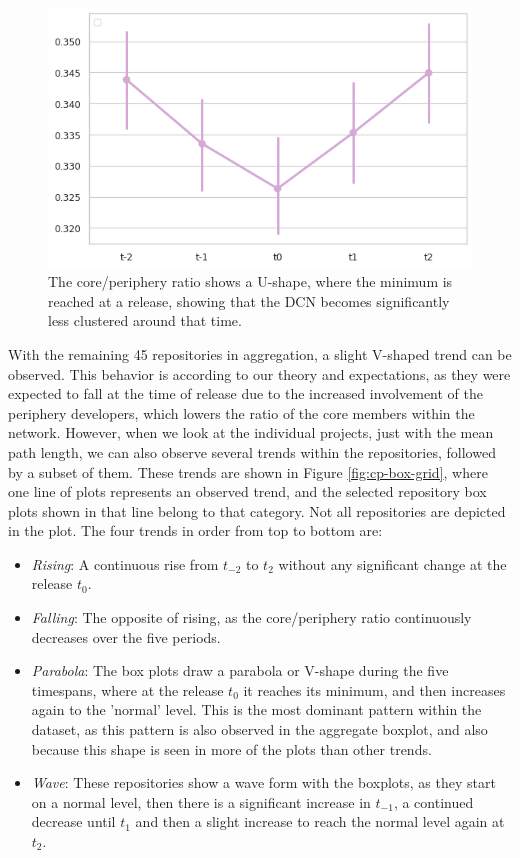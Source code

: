 \begin{figure}[!htbp]
    \centering
    \includegraphics[width=\textwidth]{figures/quantitative/pointplots/cp_ratio.png}
    \caption{The core/periphery ratio shows a U-shape, where the minimum is reached at a release, showing that the DCN becomes significantly less clustered around that time.}
    \label{fig:cp-box}
\end{figure}

With the remaining 45 repositories in aggregation, a slight V-shaped trend can be observed. This behavior is according to our theory and expectations, as they were expected to fall at the time of release due to the increased involvement of the periphery developers, which lowers the ratio of the core members within the network. However, when we look at the individual projects, just with the mean path length, we can also observe several trends within the repositories, followed by a subset of them. These trends are shown in Figure \ref{fig:cp-box-grid}, where one line of plots represents an observed trend, and the selected repository box plots shown in that line belong to that category. Not all repositories are depicted in the plot. The four trends in order from top to bottom are:

\begin{itemize}
    \item \textit{Rising}: A continuous rise from $t_{-2}$ to $t_2$ without any significant change at the release $t_0$.
    \item \textit{Falling}: The opposite of rising, as the core/periphery ratio continuously decreases over the five periods.
    \item \textit{Parabola}: The box plots draw a parabola or V-shape during the five timespans, where at the release $t_0$ it reaches its minimum, and then increases again to the 'normal' level. This is the most dominant pattern within the dataset, as this pattern is also observed in the aggregate boxplot, and also because this shape is seen in more of the plots than other trends.
    \item \textit{Wave}: These repositories show a wave form with the boxplots, as they start on a normal level, then there is a significant increase in $t_{-1}$, a continued decrease until $t_1$ and then a slight increase to reach the normal level again at $t_2$.
\end{itemize}

